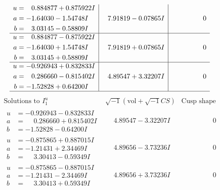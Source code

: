 \documentclass[1p]{elsarticle_modified}
\theoremstyle{definition}
\newcommand{\I}{\sqrt{-1}}
\begin{document}
$$\begin{array}{c|c|c}
\begin{aligned}
u &= \phantom{-}0.884877 + 0.875922 I \\
a &= -1.64030 - 1.54748 I \\
b &= \phantom{-}3.03145 - 0.58809 I\end{aligned}
 & \phantom{-}7.91819 - 0.07865 I & \phantom{-0.000000 } 0 \\ \hline\begin{aligned}
u &= \phantom{-}0.884877 - 0.875922 I \\
a &= -1.64030 + 1.54748 I \\
b &= \phantom{-}3.03145 + 0.58809 I\end{aligned}
 & \phantom{-}7.91819 + 0.07865 I & \phantom{-0.000000 } 0 \\ \hline\begin{aligned}
u &= -0.926943 + 0.832833 I \\
a &= \phantom{-}0.286660 - 0.815402 I \\
b &= -1.52828 + 0.64200 I\end{aligned}
 & \phantom{-}4.89547 + 3.32207 I & \phantom{-0.000000 } 0\\
 \hline 
 \end{array}$$\newpage$$\begin{array}{c|c|c}  
\text{Solutions to }I^u_{1}& \I (\text{vol} + \sqrt{-1}CS) & \text{Cusp shape}\\
 \hline 
\begin{aligned}
u &= -0.926943 - 0.832833 I \\
a &= \phantom{-}0.286660 + 0.815402 I \\
b &= -1.52828 - 0.64200 I\end{aligned}
 & \phantom{-}4.89547 - 3.32207 I & \phantom{-0.000000 } 0 \\ \hline\begin{aligned}
u &= -0.875865 + 0.887015 I \\
a &= -1.21431 + 2.34469 I \\
b &= \phantom{-}3.30413 - 0.59349 I\end{aligned}
 & \phantom{-}4.89656 - 3.73236 I & \phantom{-0.000000 } 0 \\ \hline\begin{aligned}
u &= -0.875865 - 0.887015 I \\
a &= -1.21431 - 2.34469 I \\
b &= \phantom{-}3.30413 + 0.59349 I\end{aligned}
 & \phantom{-}4.89656 + 3.73236 I & \phantom{-0.000000 } 0 \\ \hline\begin{aligned}

\end{aligned}
\end{array}$$
\end{document}

